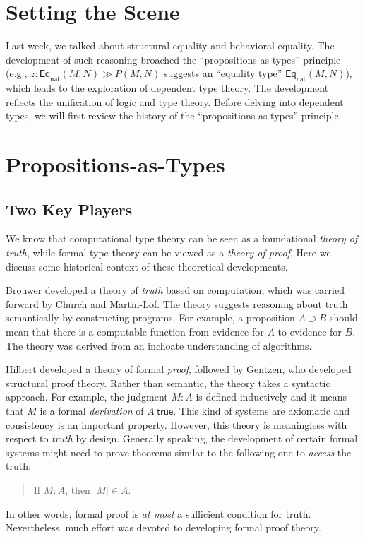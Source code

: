 \documentclass{article}
\newcommand{\tnat}{\mathsf{nat}}
\begin{document}
\maketitle

\section{Setting the Scene}

Last week, we talked about structural equality and behavioral equality.
The development of such reasoning broached the ``propositions-as-types'' principle 
(e.g., $z : \mathsf{Eq}_{\tnat}(M,N) \gg P(M,N)$ suggests an ``equality type'' 
$\mathsf{Eq}_{\tnat}(M,N)$), 
which leads to the exploration of dependent type theory.
The development reflects the unification of logic and type theory.
Before delving into dependent types, we will first review the history of the 
``propositions-as-types'' principle.

\section{Propositions-as-Types}

\subsection{Two Key Players}

We know that computational type theory can be seen as a foundational 
\emph{theory of truth}, while formal type theory can be viewed as a \emph{theory of 
proof}.
Here we discuss some historical context of these theoretical developments.

Brouwer developed a theory of \emph{truth} based on computation, which 
was carried forward by Church and Martin-L{\"o}f.
The theory suggests reasoning about truth semantically by constructing 
programs.
For example, a proposition $A \supset B$ should mean that there is a computable 
function from evidence for $A$ to evidence for $B$.
The theory was derived from an inchoate understanding of algorithms.

Hilbert developed a theory of formal \emph{proof}, followed by Gentzen, who 
developed structural proof theory.
Rather than semantic, the theory takes a syntactic approach.
For example, the judgment $M:A$ is defined inductively and it means that $M$ is a 
formal \emph{derivation} of $A~\mathsf{true}$.
This kind of systems are axiomatic and consistency is an important property.
However, this theory is meaningless with respect to \emph{truth} by design.
Generally speaking, the development of certain formal systems might need to prove 
theorems similar to the following one to \emph{access} the truth:
\begin{quotation}
	If $M : A$, then $|M| \in A$.
\end{quotation}
In other words, formal proof is \emph{at most} a sufficient condition for truth.
Nevertheless, much effort was devoted to developing formal proof theory.
\end{document}
